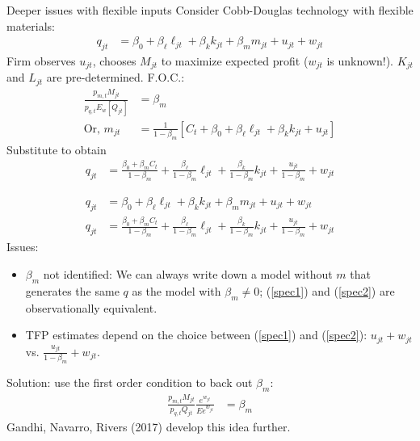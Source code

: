 
\begin{frame}{Deeper issues with flexible inputs}
	Consider Cobb-Douglas technology with flexible materials:
	\begin{align}
		q_{jt} &= \beta_0 + \beta_\ell\ell_{jt} + \beta_kk_{jt} + \beta_mm_{jt} + u_{jt} + w_{jt}
	\end{align}
	Firm observes $u_{jt}$, chooses $M_{jt}$ to maximize expected profit ($w_{jt}$ is unknown!). $K_{jt}$ and $L_{jt}$ are pre-determined. F.O.C.:
	\begin{align*}
		\frac{p_{m,t}M_{jt}}{p_{q,t}E_w[Q_{jt}]} &= \beta_m\\
		\text{Or, } m_{jt} &= \frac{1}{1-\beta_m}\left[C_t + \beta_0 + \beta_\ell\ell_{jt} + \beta_kk_{jt} + u_{jt}\right]
	\end{align*}
	Substitute to obtain
	\begin{align}
		q_{jt} &= \frac{\beta_0 + \beta_mC_t}{1-\beta_m} + \frac{\beta_\ell}{1-\beta_m}\ell_{jt} + \frac{\beta_k}{1-\beta_m}k_{jt} + \frac{u_{jt}}{1-\beta_m} + w_{jt}
	\end{align}
\end{frame}

\begin{frame}
	\begin{align}\label{spec1}
		q_{jt} &= \beta_0 + \beta_\ell\ell_{jt} + \beta_kk_{jt} + \beta_mm_{jt} + u_{jt} + w_{jt}\\\label{spec2}
		q_{jt} &= \frac{\beta_0 + \beta_mC_t}{1-\beta_m} + \frac{\beta_\ell}{1-\beta_m}\ell_{jt} + \frac{\beta_k}{1-\beta_m}k_{jt} + \frac{u_{jt}}{1-\beta_m} + w_{jt}
	\end{align}
	Issues:
	\begin{itemize}
		\item{}$\beta_m$ not identified: We can always write down a model without $m$ that generates the same $q$ as the model with $\beta_m\neq{}0$; (\ref{spec1}) and (\ref{spec2}) are observationally equivalent.
		\item{}TFP estimates depend on the choice between (\ref{spec1}) and (\ref{spec2}): $u_{jt} + w_{jt}$ vs. $\frac{u_{jt}}{1-\beta_m} + w_{jt}$.
	\end{itemize}
	Solution: use the first order condition to back out $\beta_m$:
	\begin{align*}
		\frac{p_{m,t}M_{jt}}{p_{q,t}Q_{jt}}\frac{e^{w_{jt}}}{Ee^{w_{jt}}} &= \beta_m
	\end{align*}
	Gandhi, Navarro, Rivers (2017) develop this idea further.
\end{frame}

